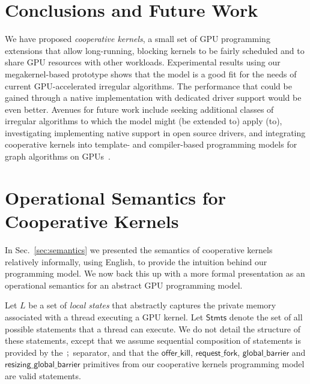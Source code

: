 \documentclass[parskip=half,sigconf,review, anonymous=true, acmcopyrightmode=none]{acmart}
\newcommand{\cutthree}[1]{}
\newcommand{\mysec}{Sec.~}
\newcommand{\code}[1]{\lstset{basicstyle=\tt}\lstinline!#1!\lstset{basicstyle=\scriptsize\tt}}
\newcommand{\offerfork}{\mathsf{request\_fork}}
\newcommand{\offerkill}{\mathsf{offer\_kill}}
\newcommand{\globalbarrier}{\mathsf{global\_barrier}}
\newcommand{\resizingglobalbarrier}{\mathsf{resizing\_global\_barrier}}
\begin{document}
\section{Conclusions and Future Work}\label{sec:conclusion}

We have proposed \emph{cooperative kernels}, a small set of GPU
programming extensions that allow long-running, blocking kernels to be
fairly scheduled and to share GPU resources with other workloads.
Experimental results using our megakernel-based prototype \cutthree{over three Intel GPUs}
shows that the model is a good fit for the needs of current
GPU-accelerated irregular algorithms.  The
performance that could be gained through a native implementation with
dedicated driver support would be even better.
%
Avenues for future work include seeking
additional classes of irregular algorithms to which the model might
(be extended to) apply (to), investigating implementing native support
in open source drivers, and integrating
cooperative kernels into template- and compiler-based programming
models for graph algorithms on
GPUs~\cite{DBLP:conf/ppopp/WangDPWRO16,DBLP:conf/oopsla/PaiP16}.

\clearpage




\iffalse


\clearpage

\appendix

\section{Operational Semantics for Cooperative Kernels}\label{appendix:semantics}

\newcommand{\myss}{\mathit{ss}}
\newcommand{\Stmts}{\mathsf{Stmts}}
\newcommand{\threadstates}{\mathsf{ThreadStates}}
\newcommand{\sharedstates}{\mathsf{SharedStates}}
\newcommand{\sync}{\mathsf{sync}}

In \mysec\ref{sec:semantics} we presented the semantics of cooperative
kernels relatively informally, using English, to provide the intuition
behind our programming model.  We now back this up with a more formal
presentation as an operational semantics for an abstract GPU
programming model.

%
Let $L$ be a set of \emph{local states} that abstractly captures the
private memory associated with a thread executing a GPU kernel.  Let
$\Stmts$ denote the set of all possible statements that a
thread can execute.  We do not detail the structure of these
statements, except that we assume sequential composition of statements
is provided by the $\code{;}$ separator, and that the $\offerkill$,
$\offerfork$, $\globalbarrier$ and $\resizingglobalbarrier$ primitives
from our cooperative kernels programming model are valid statements.
\end{document}
